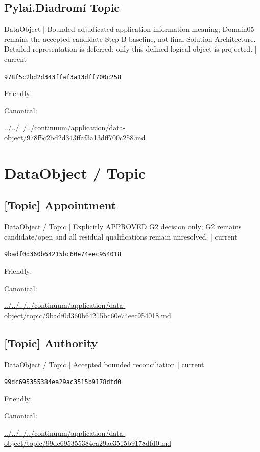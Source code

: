 \documentclass[10pt,a4paper]{article}
\begin{document}
\subsection*{Pylai.Diadromí Topic}
{\small DataObject | Bounded adjudicated application information meaning; Domain05 remains the accepted candidate Step-B baseline, not final Solution Architecture. Detailed representation is deferred; only this defined logical object is projected. | current}\par
\texttt{978f5c2bd2d343ffaf3a13dff700c258}\par
Friendly: \par
Canonical: \par
{\footnotesize\url{../../../../continuum/application/data-object/978f5c2bd2d343ffaf3a13dff700c258.md}}\par
\section*{DataObject / Topic}
\subsection*{[Topic] Appointment}
{\small DataObject / Topic | Explicitly APPROVED G2 decision only; G2 remains candidate/open and all residual qualifications remain unresolved. | current}\par
\texttt{9badf0d360b64215bc60e74eec954018}\par
Friendly: \par
Canonical: \par
{\footnotesize\url{../../../../continuum/application/data-object/topic/9badf0d360b64215bc60e74eec954018.md}}\par
\subsection*{[Topic] Authority}
{\small DataObject / Topic | Accepted bounded reconciliation | current}\par
\texttt{99dc695355384ea29ac3515b9178dfd0}\par
Friendly: \par
Canonical: \par
{\footnotesize\url{../../../../continuum/application/data-object/topic/99dc695355384ea29ac3515b9178dfd0.md}}\par
\end{document}
